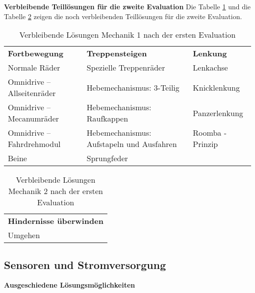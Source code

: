 \textbf{Verbleibende Teillösungen für die zweite Evaluation}
Die Tabelle \ref{tab:verbleibende-teillösungen-mechanik-1} und die Tabelle \ref{tab:verbleibende-teillösungen-mechanik-2} zeigen die noch verbleibenden Teillösungen für die zweite Evaluation.
\begin{center}
\begin{table}[h!]
    \begin{tabular}{l|l|l}
        \textbf{Fortbewegung} & \textbf{Treppensteigen} & \textbf{Lenkung}\\
        Normale Räder & Spezielle Treppenräder & Lenkachse\\ 
        Omnidrive – Allseitenräder & Hebemechanismus: 3-Teilig & Knicklenkung\\ 
        Omnidrive – Mecanumräder & Hebemechanismus: Raufkappen & Panzerlenkung\\ 
        Omnidrive – Fahrdrehmodul & Hebemechanismus: Aufstapeln und Ausfahren & Roomba - Prinzip\\ 
        Beine & Sprungfeder &\\
    \end{tabular}
    \caption{Verbleibende Lösungen Mechanik 1 nach der ersten Evaluation}
    \label{tab:verbleibende-teillösungen-mechanik-1}
\end{table}
\end{center}

\begin{center}
\begin{table}[h!]
    \begin{tabular}{l}
        \textbf{Hindernisse überwinden}\\
        Umgehen
    \end{tabular}
    \caption{Verbleibende Lösungen Mechanik 2 nach der ersten Evaluation}
    \label{tab:verbleibende-teillösungen-mechanik-2}
\end{table}
\end{center}
\newpage


\subsection*{Sensoren und Stromversorgung}
\textbf{Ausgeschiedene Lösungsmöglichkeiten}

